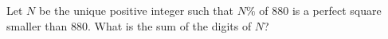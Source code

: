 Let $N$ be the unique positive integer such that $N\%$ of $880$ is a perfect square smaller than $880$. What is the sum of the digits of $N$?

